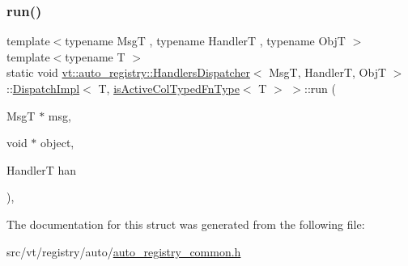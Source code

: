 \subsubsection{\texorpdfstring{run()}{run()}}
{\footnotesize\ttfamily template$<$typename MsgT , typename HandlerT , typename ObjT $>$ \\
template$<$typename T $>$ \\
static void \hyperlink{structvt_1_1auto__registry_1_1_handlers_dispatcher}{vt\+::auto\+\_\+registry\+::\+Handlers\+Dispatcher}$<$ MsgT, HandlerT, ObjT $>$\+::\hyperlink{structvt_1_1auto__registry_1_1_handlers_dispatcher_1_1_dispatch_impl}{Dispatch\+Impl}$<$ T, \hyperlink{structvt_1_1auto__registry_1_1_handlers_dispatcher_a1c50adc2b2f2ac67f9cc793cdddbf2f5}{is\+Active\+Col\+Typed\+Fn\+Type}$<$ T $>$ $>$\+::run (\begin{DoxyParamCaption}\item[{MsgT $\ast$}]{msg,  }\item[{void $\ast$}]{object,  }\item[{HandlerT}]{han }\end{DoxyParamCaption})\hspace{0.3cm}{\ttfamily [inline]}, {\ttfamily [static]}}



The documentation for this struct was generated from the following file\+:\begin{DoxyCompactItemize}
\item 
src/vt/registry/auto/\hyperlink{auto__registry__common_8h}{auto\+\_\+registry\+\_\+common.\+h}\end{DoxyCompactItemize}
